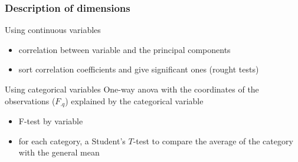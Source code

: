 \documentclass{beamer}\usepackage[]{graphicx}\usepackage[]{color}
\begin{document}


\begin{frame}[fragile]
\frametitle{Description of  dimensions}
  
  \begin{block}{Using continuous variables}
    \begin{itemize}
      \item correlation between variable and the principal components
      \item sort correlation coefficients and give significant ones (rought tests)
    \end{itemize}
  \end{block}
  
  \begin{block}{Using categorical variables}
    One-way anova with the coordinates of the observations ($F_{.q}$) explained by the categorical variable
    \begin{itemize}
      \item F-test by variable
      \item for each category, a Student's $T$-test to compare the average of the category with the general mean
    \end{itemize}
  \end{block}

\end{frame}
\end{document}
